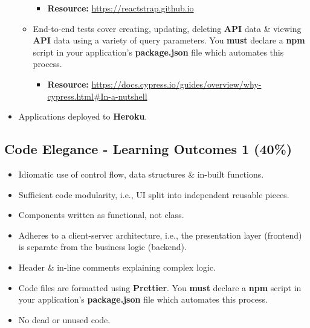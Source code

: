 \documentclass{article}
\begin{document}
\begin{itemize}
\begin{itemize}
		\begin{itemize}
			\item \textbf{Resource:} \footnotesize\href{https://reactstrap.github.io}{https://reactstrap.github.io}
		\end{itemize}
		\item End-to-end tests cover creating, updating, deleting \textbf{API} data \& viewing \textbf{API} data using a variety of query parameters. You \textbf{must} declare a \textbf{npm} script in your application's \textbf{package.json} file which automates this process.
		\begin{itemize}
			\item \textbf{Resource:} \footnotesize\href{https://docs.cypress.io/guides/overview/why-cypress.html#In-a-nutshell}{https://docs.cypress.io/guides/overview/why-cypress.html\#In-a-nutshell}
		\end{itemize}
	\end{itemize}
	\item Applications deployed to \textbf{Heroku}. 
\end{itemize}

\subsection*{Code Elegance - Learning Outcomes 1 (40\%)}
\begin{itemize}
	\item Idiomatic use of control flow, data structures \& in-built functions.
	\item Sufficient code modularity, i.e., UI split into independent reusable pieces.
	\item Components written as functional, not class.
	\item Adheres to a client-server architecture, i.e., the presentation layer (frontend) is separate from the business logic (backend).
	\item Header \& in-line comments explaining complex logic.
	\item Code files are formatted using \textbf{Prettier}. You \textbf{must} declare a \textbf{npm} script in your application's \textbf{package.json} file which automates this process.
	\item No dead or unused code.
\end{itemize}
\end{document}
